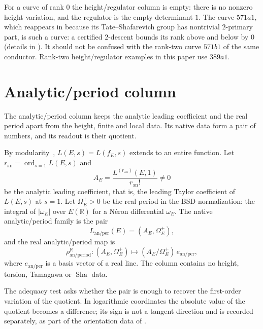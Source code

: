 \documentclass[11pt]{article}
\theoremstyle{definition}
\newcommand{\R}{\mathbb{R}}
\newcommand{\Sha}{\operatorname{Sha}}
\begin{document}
\begin{warning}\label{warn:apparatus:571a1-carrier}
For a curve of rank $0$ the height/regulator column is empty: there is no
nonzero height variation, and the regulator is the empty determinant $1$.
The curve $571a1$, which reappears in  because
its Tate--Shafarevich group has nontrivial $2$-primary part, is such a
curve: a certified $2$-descent bounds its rank above and below by $0$
(details in ).  It should not be confused with
the rank-two curve $571b1$ of the same conductor.  Rank-two
height/regulator examples in this paper use $389a1$.
\end{warning}
 \section{Analytic/period column}
\label{sec:analytic-period}

The analytic/period column keeps the analytic leading coefficient and the
real period apart from the height, finite and local data.  Its native data
form a pair of numbers, and its readout is their quotient.

\begin{definition}\label{def:apparatus:analytic-period-map}
By modularity~\citep{Wiles1995,BreuilConradDiamondTaylor2001},
$L(E,s)=L(f_E,s)$ extends to an entire function.  Let
$r_{\mathrm{an}}=\operatorname{ord}_{s=1}L(E,s)$ and
\[
  A_E=\frac{L^{(r_{\mathrm{an}})}(E,1)}{r_{\mathrm{an}}!}\neq0
\]
be the analytic leading coefficient, that is, the leading Taylor
coefficient of $L(E,s)$ at $s=1$.  Let $\Omega_E^+>0$ be the real period
in the BSD normalization: the integral of $|\omega_E|$ over $E(\R)$ for a
N\'eron differential $\omega_E$.  The native analytic/period family is the
pair
\[
  L_{\mathrm{an/per}}(E)=(A_E,\Omega_E^+),
\]
and the real analytic/period map is
\[
  \rho_{\mathrm{an/period}}^{\R}:(A_E,\Omega_E^+)\longmapsto
  (A_E/\Omega_E^+)\,e_{\mathrm{an/per}},
\]
where $e_{\mathrm{an/per}}$ is a basis vector of a real line.  The column
contains no height, torsion, Tamagawa or $\Sha$ data.
\end{definition}

The adequacy test asks whether the pair is enough to recover the first-order
variation of the quotient.  In logarithmic coordinates the absolute value
of the quotient becomes a difference; its sign is not a tangent direction
and is recorded separately, as part of the orientation data of
.
\end{document}
